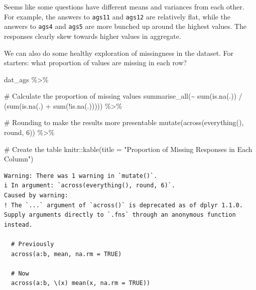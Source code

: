 \documentclass[
  letterpaper,
  DIV=11,
  numbers=noendperiod]{scrreprt}
\newenvironment{Shaded}{\begin{snugshade}}{\end{snugshade}}
\newcommand{\AttributeTok}[1]{\textcolor[rgb]{0.40,0.45,0.13}{#1}}
\newcommand{\CommentTok}[1]{\textcolor[rgb]{0.37,0.37,0.37}{#1}}
\newcommand{\DecValTok}[1]{\textcolor[rgb]{0.68,0.00,0.00}{#1}}
\newcommand{\FunctionTok}[1]{\textcolor[rgb]{0.28,0.35,0.67}{#1}}
\newcommand{\NormalTok}[1]{\textcolor[rgb]{0.00,0.23,0.31}{#1}}
\newcommand{\SpecialCharTok}[1]{\textcolor[rgb]{0.37,0.37,0.37}{#1}}
\newcommand{\StringTok}[1]{\textcolor[rgb]{0.13,0.47,0.30}{#1}}
\begin{document}
Seems like some questions have different means and variances from each
other. For example, the answers to \texttt{ags11} and \texttt{ags12} are
relatively flat, while the answers to \texttt{ags4} and \texttt{ags5}
are more bunched up around the highest values. The responses clearly
skew towards higher values in aggregate.

We can also do some healthy exploration of missingness in the dataset.
For starters: what proportion of values are missing in each row?

\begin{Shaded}
\begin{Highlighting}[]
\NormalTok{dat\_ags }\SpecialCharTok{\%\textgreater{}\%} 
  
  \CommentTok{\# Calculate the proportion of missing values }
  \FunctionTok{summarise\_all}\NormalTok{(}\SpecialCharTok{\textasciitilde{}} \FunctionTok{sum}\NormalTok{(}\FunctionTok{is.na}\NormalTok{(.)) }\SpecialCharTok{/}\NormalTok{ (}\FunctionTok{sum}\NormalTok{(}\FunctionTok{is.na}\NormalTok{(.) }\SpecialCharTok{+} \FunctionTok{sum}\NormalTok{(}\SpecialCharTok{!}\FunctionTok{is.na}\NormalTok{(.))))) }\SpecialCharTok{\%\textgreater{}\%} 
  
  \CommentTok{\# Rounding to make the results more presentable}
  \FunctionTok{mutate}\NormalTok{(}\FunctionTok{across}\NormalTok{(}\FunctionTok{everything}\NormalTok{(), round, }\DecValTok{6}\NormalTok{)) }\SpecialCharTok{\%\textgreater{}\%} 
  
  \CommentTok{\# Create the table}
\NormalTok{  knitr}\SpecialCharTok{::}\FunctionTok{kable}\NormalTok{(}\AttributeTok{title =} \StringTok{"Proportion of Missing Responses in Each Column"}\NormalTok{) }
\end{Highlighting}
\end{Shaded}

\begin{verbatim}
Warning: There was 1 warning in `mutate()`.
i In argument: `across(everything(), round, 6)`.
Caused by warning:
! The `...` argument of `across()` is deprecated as of dplyr 1.1.0.
Supply arguments directly to `.fns` through an anonymous function instead.

  # Previously
  across(a:b, mean, na.rm = TRUE)

  # Now
  across(a:b, \(x) mean(x, na.rm = TRUE))
\end{verbatim}
\end{document}
